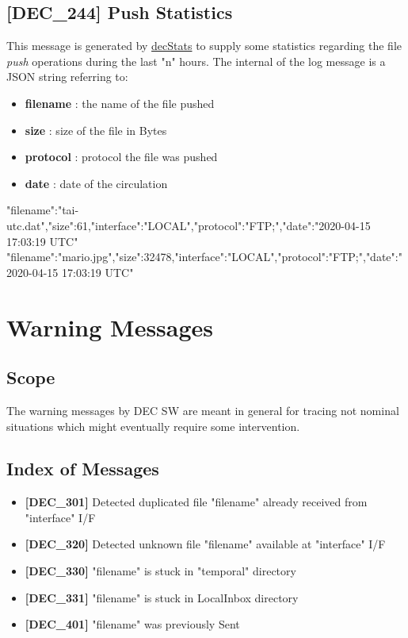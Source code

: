 \documentclass[dec_sum_main.tex]{subfiles}
\begin{document}
\subsection{[DEC\_244] Push Statistics}
This message is generated by \hyperref[decStats]{decStats} to supply some statistics regarding the file \textit{push} operations during the last "n" hours.\newline
The internal of the log message is a JSON string referring to:
\begin{itemize}
	\item \textbf{filename} : the name of the file pushed
	\item \textbf{size} : size of the file in Bytes
	\item \textbf{protocol} : protocol the file was pushed
	\item \textbf{date} : date of the circulation
\end{itemize}
\begin{verbnobox}[\fontsize{8pt}{8pt}\selectfont]
{"filename":"tai-utc.dat","size":61,"interface":"LOCAL","protocol":"FTP;","date":"2020-04-15 17:03:19 UTC"}
{"filename":"mario.jpg","size":32478,"interface":"LOCAL","protocol":"FTP;","date":"2020-04-15 17:03:19 UTC"}
\end{verbnobox}



\newpage

\section{Warning Messages}

\subsection{Scope}
The warning messages by DEC SW are meant in general for tracing not nominal situations which might eventually require some intervention.

\subsection{Index of Messages}

\begin{itemize}
	\item \textbf{[DEC\_301]} Detected duplicated file "filename" already received from "interface" I/F
	\item \textbf{[DEC\_320]} Detected unknown file "filename" available at "interface" I/F
	\item \textbf{[DEC\_330]} "filename" is stuck in "temporal" directory
	\item \textbf{[DEC\_331]} "filename" is stuck in LocalInbox directory
	\item \textbf{[DEC\_401]} "filename" was previously Sent
\end{itemize}
\end{document}
